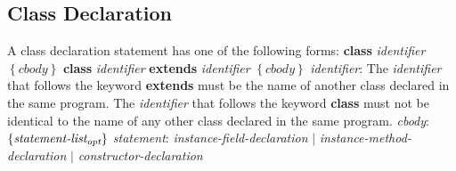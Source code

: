 \begin{homeworkProblem}
    \subsection{Class Declaration}
    A class declaration statement has one of the following forms:
    \newline
    \textbf{class} \textit{identifier} $\left\{ \textit{cbody} \right\}$
    \newline
    \textbf{class} \textit{identifier} \textbf{extends} \textit{identifier} $\left\{ \textit{cbody} \right\}$
    \newline
    \textit{identifier}: The \textit{identifier} that follows the keyword \textbf{extends} must be the name of another class declared in the same program. The \textit{identifier} that follows the keyword \textbf{class} must not be identical to the name of any other class declared in the same program.
    \newline
    \textit{cbody}: $\left\{ \textit{statement-list\textsubscript{opt}} \right\}$
    \newline
    \textit{statement}: \textit{instance-field-declaration} $|$ \textit{instance-method-declaration} $|$ \textit{constructor-declaration}
	
\end{homeworkProblem}
